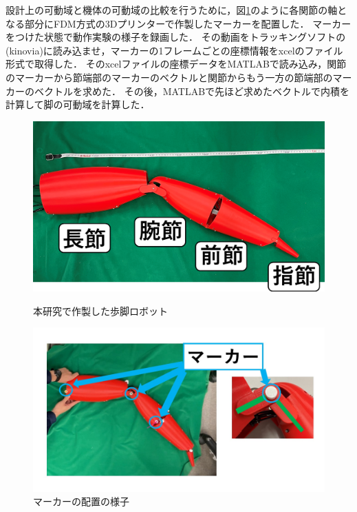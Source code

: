 設計上の可動域と機体の可動域の比較を行うために，図\ref{fig:marker_jikki}のように各関節の軸となる部分にFDM方式の3Dプリンターで作製したマーカーを配置した．
マーカーをつけた状態で動作実験の様子を録画した．
その動画をトラッキングソフトの(kinovia)に読み込ませ，マーカーの1フレームごとの座標情報をxcelのファイル形式で取得した．
そのxcelファイルの座標データをMATLABで読み込み，関節のマーカーから節端部のマーカーのベクトルと関節からもう一方の節端部のマーカーのベクトルを求めた．
その後，MATLABで先ほど求めたベクトルで内積を計算して脚の可動域を計算した．
\begin{figure}[ht]
    \begin{minipage}{0.49\hsize}
      \centering
      \includegraphics[scale=0.2]{image/jikki_2.png}
      \caption{本研究で作製した歩脚ロボット}
      \label{fig:kanirobot_new}
    \end{minipage}
    \begin{minipage}{0.49\hsize}
      \centering
      \includegraphics[scale=0.2]{image/marker.jpg}
      \caption{マーカーの配置の様子}
      \label{fig:marker_jikki}
    \end{minipage}
\end{figure}
